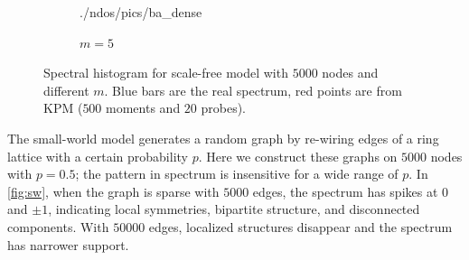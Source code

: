 \begin{figure}[ht]
\begin{subfigure}{0.47\textwidth}
    {./ndos/pics/ba_dense}
    \caption{$m = 5$}\label{fig:ba_dense}
  \end{subfigure}
  \caption{Spectral histogram for scale-free model with $5000$ nodes and
  different $m$. Blue bars are the real spectrum, red points are from KPM
  ($500$ moments and $20$ probes).} \label{fig:ba}
\end{figure}

The small-world model generates a random graph by re-wiring edges of a ring
lattice with a certain probability $p$. Here we construct these graphs on $5000$
nodes with $p=0.5$; the pattern in spectrum is insensitive for a wide range of
$p$. In \cref{fig:sw}, when the graph is sparse with $5000$ edges, the spectrum
has spikes at $0$ and $\pm 1$, indicating local symmetries, bipartite structure,
and disconnected components. With $50000$ edges, localized structures disappear
and the spectrum has narrower support.

